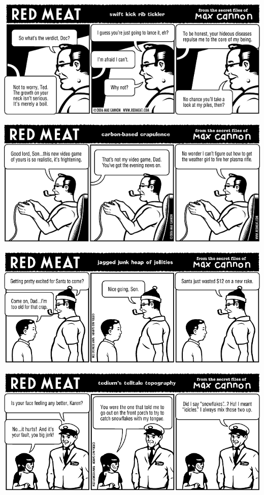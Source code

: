 \documentclass[a4paper,twoside,11pt]{article}
\begin{document}
\includegraphics[width=\textwidth]{redmeat_2006-12-19.png}



\includegraphics[width=\textwidth]{redmeat_2006-12-26.png}



\includegraphics[width=\textwidth]{redmeat_2007-01-02.png}



\includegraphics[width=\textwidth]{redmeat_2007-01-09.png}
\end{document}
